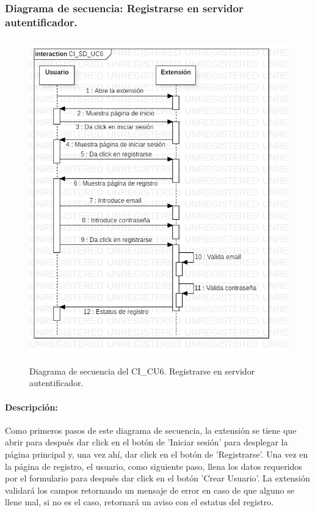 \documentclass[12pt, a4paper, titlepage]{report}
\begin{document}
        		\subsubsection{Diagrama de secuencia: Registrarse en servidor autentificador.}
        			\begin{figure}[H]
        				\begin{center}    		    	\includegraphics[height=14cm]{./imagenes/Disenio/Componente_1/CI_SD_UC6.png}
        				\caption[Diagrama de secuencia 6 del Componente I]{Diagrama de secuencia del CI\_CU6. Registrarse en servidor autentificador.}
        				\end{center}
        			\end{figure}
        			
        			\paragraph{Descripción:}	
    			         Como primeros pasos de este diagrama de secuencia, la extensión se tiene que abrir para después dar click en el botón de 'Iniciar sesión' para desplegar la página principal y, una vez ahí, dar click en el botón de 'Registrarse'. Una vez en la página de registro, el usuario, como siguiente paso, llena los datos requeridos por el formulario para después dar click en el botón 'Crear Usuario'. La extensión validará los campos retornando un mensaje de error en caso de que alguno se llene mal, si no es el caso, retornará un aviso con el estatus del registro.
    			
\end{document}
